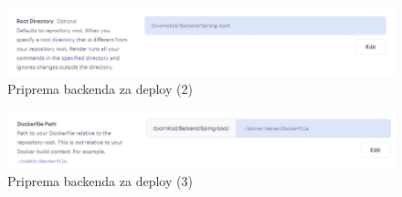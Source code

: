 			
			\begin{figure}[H]
				\includegraphics[width=\textwidth]{slike/Priprema_backenda2.jpg} 
				\centering
				\vspace{-0.2cm}
				\caption{Priprema backenda za deploy (2)}
				\label{back2}
			\end{figure}
			
			\begin{figure}[H]
				\includegraphics[width=\textwidth]{slike/Priprema_backenda3.jpg} 
				\centering
				\vspace{-0.2cm}
				\caption{Priprema backenda za deploy (3)}
				\label{back3}
			\end{figure}
			
			
			\eject 